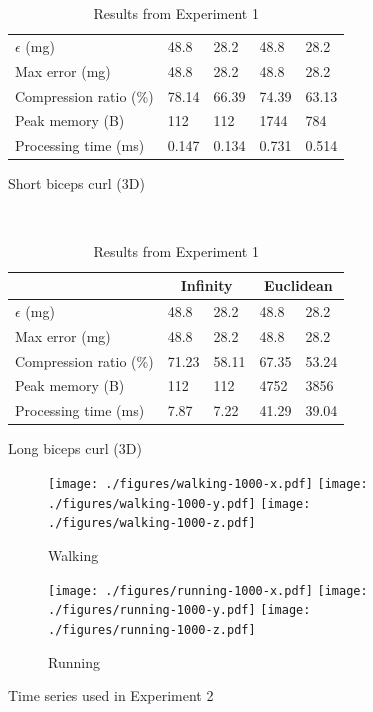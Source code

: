 \documentclass[10pt, conference, compsocconf]{IEEEtran}
\begin{document}
\begin{table}
\begin{subfigure}{\columnwidth}
\begin{tabular}{l|l|l|l|l}
    $\epsilon$ (mg)        & 48.8          & 28.2          & 48.8   & 28.2   \\
    Max error  (mg)        & 48.8          & 28.2          & 48.8   & 28.2   \\
    Compression ratio (\%) & 78.14         & 66.39         & 74.39  & 63.13   \\
    Peak memory (B)        & 112           & 112           & 1744   & 784    \\
    Processing time (ms)   & 0.147         & 0.134         & 0.731  & 0.514  \\ \hline
    \end{tabular}
    \caption{Short biceps curl (3D)}
    \end{subfigure}\\
    \begin{subfigure}{\columnwidth}
    \centering
    \begin{tabular}{l|l|l|l|l}
    \hline
    \rowcolor{headcolor}
                              & \multicolumn{2}{c|}{Infinity} & \multicolumn{2}{c}{Euclidean} \\ \hline
    $\epsilon$ (mg)                & 48.8        & 28.2       & 48.8     & 28.2    \\
    Max error  (mg)                & 48.8        & 28.2       & 48.8     & 28.2    \\
    Compression ratio (\%)         & 71.23       & 58.11      & 67.35    & 53.24   \\
    Peak memory (B)                & 112         & 112        & 4752     & 3856    \\
    Processing time (ms)           & 7.87        & 7.22       & 41.29    & 39.04   \\ \hline
    \end{tabular}
    \caption{Long biceps curl (3D)}
    \end{subfigure}
    \caption{Results from Experiment 1}
    \label{table:results-validation}
\end{table}

\begin{figure}
\centering
\begin{subfigure}{1.85\columnwidth}
\centering
\texttt{[image: ./figures/walking-1000-x.pdf]}
\texttt{[image: ./figures/walking-1000-y.pdf]}
\texttt{[image: ./figures/walking-1000-z.pdf]}
\caption{Walking}
\end{subfigure}
\begin{subfigure}{1.85\columnwidth}
\centering
\texttt{[image: ./figures/running-1000-x.pdf]}
\texttt{[image: ./figures/running-1000-y.pdf]}
\texttt{[image: ./figures/running-1000-z.pdf]}
\caption{Running}
\end{subfigure}
\caption{Time series used in Experiment 2 \vspace*{-0.3cm}}
\label{fig:datasets-2}
\end{figure}
\end{document}
